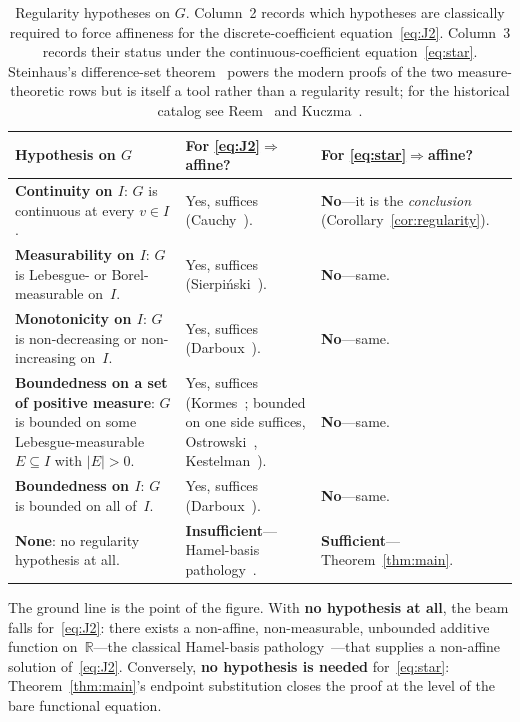 \documentclass{article}
\theoremstyle{plain}
\theoremstyle{definition}
\newcommand{\R}{\mathbb{R}}
\begin{document}
\begin{table}[ht]
\renewcommand{\arraystretch}{1.4}
\centering
\begin{tabularx}{\linewidth}{@{} >{\raggedright\arraybackslash}X
  >{\raggedright\arraybackslash}X
  >{\raggedright\arraybackslash}X @{}}
\toprule
\textbf{Hypothesis on $G$} &
\textbf{For \eqref{eq:J2}$\Rightarrow$affine?} &
\textbf{For \eqref{eq:star}$\Rightarrow$affine?} \\
\midrule
\textbf{Continuity on $I$}: $G$ is continuous at every $v\in I$.
  & Yes, suffices (Cauchy~\cite{Cauchy1821}).
  & \textbf{No}---it is the \emph{conclusion} (Corollary~\ref{cor:regularity}). \\
\midrule
\textbf{Measurability on $I$}: $G$ is Lebesgue- or Borel-measurable on~$I$.
  & Yes, suffices (Sierpi\'nski~\cite{Sierpinski1920}).
  & \textbf{No}---same. \\
\midrule
\textbf{Monotonicity on $I$}: $G$ is non-decreasing or non-increasing on~$I$.
  & Yes, suffices (Darboux~\cite{Darboux1875}).
  & \textbf{No}---same. \\
\midrule
\textbf{Boundedness on a set of positive measure}: $G$ is bounded on some
  Lebesgue-measurable $E\subseteq I$ with $|E|>0$.
  & Yes, suffices (Kormes~\cite{Kormes1926}; bounded on one side
    suffices, Ostrowski~\cite{Ostrowski1929},
    Kestelman~\cite{Kestelman1947}).
  & \textbf{No}---same. \\
\midrule
\textbf{Boundedness on $I$}: $G$ is bounded on all of~$I$.
  & Yes, suffices (Darboux~\cite{Darboux1880}).
  & \textbf{No}---same. \\
\midrule
\textbf{None}: no regularity hypothesis at all.
  & \textbf{Insufficient}---Hamel-basis pathology~\cite{Hamel1905}.
  & \textbf{Sufficient}---Theorem~\ref{thm:main}. \\
\bottomrule
\end{tabularx}
\caption{Regularity hypotheses on $G$. Column~2 records which hypotheses
are classically required to force affineness for the
discrete-coefficient equation~\eqref{eq:J2}. Column~3 records their
status under the continuous-coefficient equation~\eqref{eq:star}.
Steinhaus's difference-set theorem~\cite{Steinhaus1920} powers the
modern proofs of the two measure-theoretic rows but is itself a tool
rather than a regularity result; for the historical catalog see
Reem~\cite{Reem2017} and Kuczma~\cite[\S13.2]{Kuczma2009}.}
\label{tab:dictionary}
\end{table}

The ground line is the point of the figure. With \textbf{no
hypothesis at all}, the beam falls for~\eqref{eq:J2}: there exists a
non-affine, non-measurable, unbounded additive function
on~$\R$---the classical Hamel-basis pathology~\cite{Hamel1905}---that
supplies a non-affine solution of~\eqref{eq:J2}. Conversely,
\textbf{no hypothesis is needed} for~\eqref{eq:star}:
Theorem~\ref{thm:main}'s endpoint substitution closes the proof at
the level of the bare functional equation.
\end{document}
